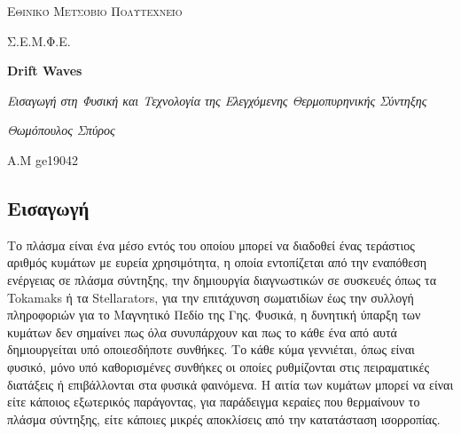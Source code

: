 \documentclass[a4paper]{article}
\begin{document}
\begin{titlepage}			%
	\centering
	{\scshape\LARGE Εθινικό Μετσόβιο Πολυτεχνείο\par}
	{\scshape \LARGE Σ.Ε.Μ.Φ.Ε.\par}
	\vspace{1cm}
	{\huge\bfseries Drift Waves\par}
	\vspace{1cm}
	{\Large\itshape Εισαγωγή στη Φυσική και Τεχνολογία της Ελεγχόμενης Θερμοπυρηνικής Σύντηξης\par}
	\vspace{5cm}
	{\Large\itshape Θωμόπουλος Σπύρος\par}		%
	
	{\large A.M ge19042 \hfill \\}%
	\vspace{1cm}
\end{titlepage}


\newpage 
	\subsection*{Εισαγωγή}
	Το πλάσμα είναι ένα μέσο εντός του οποίου μπορεί να διαδοθεί ένας τεράστιος αριθμός κυμάτων με ευρεία χρησιμότητα, η οποία εντοπίζεται από την εναπόθεση ενέργειας σε πλάσμα σύντηξης, την δημιουργία διαγνωστικών σε συσκευές όπως τα Tokamaks ή τα Stellarators, για την επιτάχυνση σωματιδίων έως την συλλογή πληροφοριών για το Μαγνητικό Πεδίο της Γης. Φυσικά, η δυνητική ύπαρξη των κυμάτων δεν σημαίνει πως όλα συνυπάρχουν και πως το κάθε ένα από αυτά δημιουργείται υπό οποιεσδήποτε συνθήκες. Το κάθε κύμα γεννιέται, όπως είναι φυσικό, μόνο υπό καθορισμένες συνθήκες οι οποίες ρυθμίζονται στις πειραματικές διατάξεις ή επιβάλλονται στα φυσικά φαινόμενα.
	Η αιτία των κυμάτων μπορεί να είναι είτε κάποιος εξωτερικός παράγοντας, για παράδειγμα κεραίες που θερμαίνουν το πλάσμα σύντηξης, είτε κάποιες μικρές αποκλίσεις από την κατατάσταση ισορροπίας.
\end{document}
